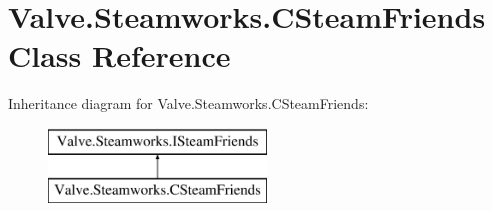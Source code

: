 \hypertarget{classValve_1_1Steamworks_1_1CSteamFriends}{}\section{Valve.\+Steamworks.\+C\+Steam\+Friends Class Reference}
\label{classValve_1_1Steamworks_1_1CSteamFriends}
Inheritance diagram for Valve.\+Steamworks.\+C\+Steam\+Friends\+:\begin{figure}[H]
\begin{center}
\leavevmode
\includegraphics[height=2.000000cm]{classValve_1_1Steamworks_1_1CSteamFriends}
\end{center}
\end{figure}
